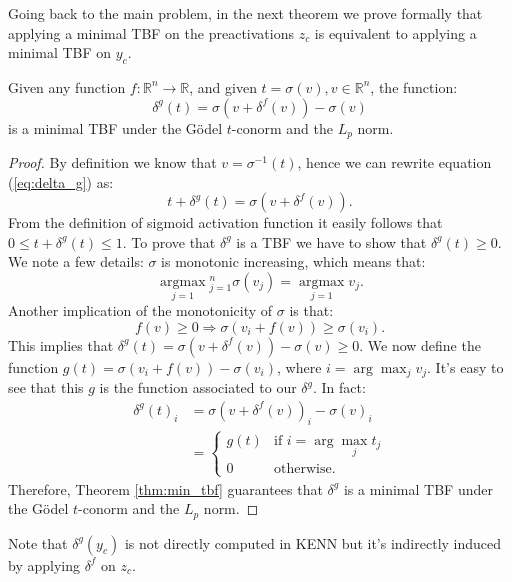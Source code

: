 Going back to the main problem, in the next theorem we prove formally that applying a minimal TBF on the preactivations $z_c$ is equivalent to applying a minimal TBF on $y_c$.
\begin{theorem}
	Given any function $f:\mathbb{R}^n\rightarrow\mathbb{R}$, and given $t = \sigma(v), v\in 
	\mathbb{R}^n$, the function:
	\begin{equation}
	\delta^g(t) = \sigma(v+\delta^f(v))-\sigma(v)
	\label{eq:delta_g}
	\end{equation}
	is a minimal TBF under the Gödel $t$-conorm and the $L_p$ norm.
\end{theorem}
\begin{proof}
	By definition we know that $v = \sigma^{-1} (t)$, hence we can rewrite equation (\ref{eq:delta_g}) as:
	$$ t + \delta^g(t) = \sigma(v + \delta^f(v)).$$
	From the definition of sigmoid activation function it easily follows that $0 \leq t + \delta^g(t) \leq 1$. To prove that $\delta^g$ is a TBF we have to show that $\delta^g(t) \geq 0$.
	We note a few details: $\sigma$ is monotonic increasing, which means that:
	$$
	\underset{j=1}{\operatorname{argmax}}{ }_{j=1}^{n} \sigma\left(v_{j}\right)=\underset{j=1}{\operatorname{argmax}} v_{j}.
	$$
	Another implication of the monotonicity of $\sigma$ is that:
	$$
	f(v) \geq 0 \Rightarrow \sigma\left(v_{i}+f(v)\right) \geq \sigma\left(v_{i}\right).
	$$
	This implies that $\delta^g(t)=\sigma(v+\delta^f(v)) - \sigma(v) \geq 0$.
	We now define the function $g(t) = \sigma(v_i + f(v)) - \sigma(v_i)$, where $i = \arg\max_j v_j$. It's easy to see that this $g$ is the function associated to our $\delta^g$. In fact:
	\begin{align*}
	\delta^g(t)_i &= \sigma(v + \delta^f(v))_i - \sigma(v)_i \\
	&=\begin{cases}
	g(t) &\text{if } i=\arg\max_j t_j\\
	0 &\text{otherwise.}
	\end{cases}
	\end{align*}
	Therefore, Theorem \ref{thm:min_tbf} guarantees that $\delta^g$ is a minimal TBF under the Gödel $t$-conorm and the $L_p$ norm.
\end{proof}
Note that $\delta^g(y_c)$ is not directly computed in KENN but it's indirectly induced by applying $\delta^f$ on $z_c$. 

